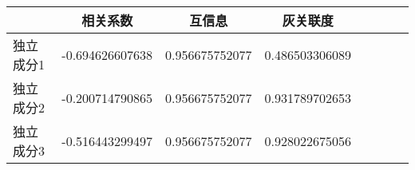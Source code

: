 \begin{table}[!tphb] 
\begin{center}
\begin{tabular}{lccclccc} 
 \toprule 
& 相关系数   & 互信息    &灰关联度 \\ 
\midrule 
独立成分1	& -0.694626607638	& 0.956675752077	& 0.486503306089	\\ 
独立成分2	& -0.200714790865	& 0.956675752077	& 0.931789702653	\\ 
独立成分3	& -0.516443299497	& 0.956675752077	& 0.928022675056	\\ 
\bottomrule 
 \end{tabular} 
\end{center} 
 \end{table} 
